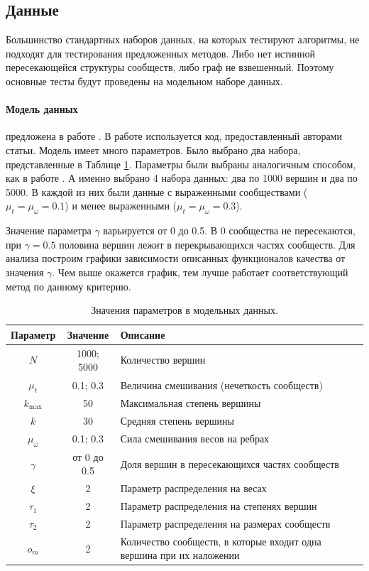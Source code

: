 \documentclass{ITaSconf}
\begin{document}
\subsection{Данные}
Большинство стандартных наборов данных, на которых тестируют алгоритмы, не подходят для тестирования предложенных методов.
Либо нет истинной пересекающейся структуры сообществ, либо граф не взвешенный. 
Поэтому основные тесты будут проведены на модельном наборе данных.

\paragraph{Модель данных} 
предложена в работе \cite{lancichinetti2009benchmarks}. 
В работе используется код, предоставленный авторами статьи. 
Модель имеет много параметров. 
Было выбрано два набора, представленные в Таблице \ref{table:bench_params}. 
Параметры были выбраны аналогичным способом, как в работе \cite{lu2015algorithms}. А именно выбрано 4 набора данных: два по 1000 вершин и два по 5000. В каждой из них были данные с выраженными сообществами ($\mu_t=\mu_{\omega}=0.1$) и менее выраженными ($\mu_t=\mu_{\omega}=0.3$).

Значение параметра $\gamma$ варьируется от 0 до 0.5. 
В 0 сообщества не пересекаются, при $\gamma=0.5$ половина вершин лежит в перекрывающихся частях сообществ.
Для анализа построим графики зависимости описанных функционалов качества от значения $\gamma$. 
Чем выше окажется график, тем лучше работает соответствующий метод по данному критерию.

\begin{center}
	\begin{table}
		\centering
		\begin{tabular}{ c c l }
			\hline
			\hline
			\textbf{Параметр} & \textbf{Значение} & \textbf{Описание} \\
			\hline
			$N$				& 1000; 5000 	& Количество вершин	\\[2px]
			$\mu_t$			& 0.1; 0.3 		& Величина смешивания (нечеткость сообществ)\\[2px]
			$k_{\max}$		& 50 			& Максимальная степень вершины\\[2px]
			$k$				& 30	 		& Средняя степень вершины\\[2px]
			$\mu_{\omega}$	& 0.1; 0.3 		& Сила смешивания весов на ребрах\\[2px]
			$\gamma$		& от 0 до 0.5 	& Доля вершин в пересекающихся частях сообществ\\[2px]
			$\xi$			& 2 			& Параметр распределения на весах\\[2px]
			$\tau_1$		& 2 			& Параметр распределения на степенях вершин\\[2px]
			$\tau_2$		& 2 			& Параметр распределения на размерах сообществ\\[2px]
			$o_m$			& 2 			& Количество сообществ, в которые входит одна вершина при их наложении \\
			\hline
			\hline
		\end{tabular}
		\centering
		\caption{Значения параметров в модельных данных. }
		\label{table:bench_params}
	\end{table}
\end{center}
\end{document}

